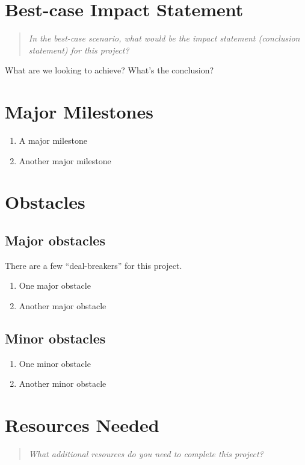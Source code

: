 \documentclass{proc}
\begin{document}
\section{Best-case Impact Statement}
\begin{quote}
\textit {In the best-case scenario, what would be the impact statement (conclusion statement) for this project?}
\end{quote}

What are we looking to achieve?  What's the conclusion?

\section{Major Milestones}

\begin{enumerate}
\item A major milestone
\item Another major milestone
\end{enumerate}


\section{Obstacles}

\subsection{Major obstacles} %

There are a few ``deal-breakers'' for this project.  
\begin{enumerate} 
\item One major obstacle
\item Another major obstacle
\end{enumerate}

\subsection{Minor obstacles}

\begin{enumerate} 
\item One minor obstacle
\item Another minor obstacle
\end{enumerate}

\section{Resources Needed}
\begin{quote}
\textit{What additional resources do you need to complete this project?}
\end{quote}
\end{document}
